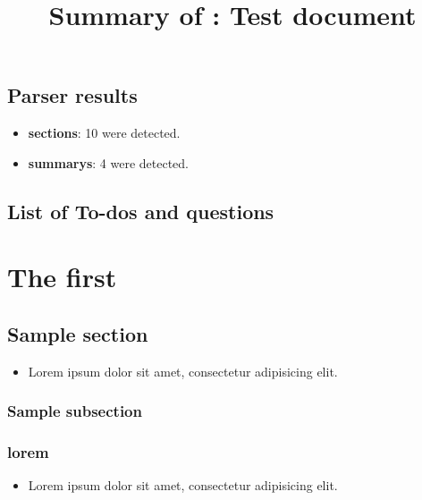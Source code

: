 \title{Summary of : Test document}
\maketitle

\section{Parser results}
    \begin{itemize}[noitemsep]
\item \textbf{sections}: 10 were detected.
\item \textbf{summarys}: 4 were detected.
    \end{itemize}

\section{List of To-dos and questions}
\vspace{-36pt}\hspace{11pt}

\chapter{The first}
\label{autosec:0}
\vspace{-36pt}\hspace{11pt}
\section{Sample section}
\label{autosec:1}
    \begin{itemize}[noitemsep]
        \item Lorem ipsum dolor sit amet, consectetur adipisicing elit.
    \end{itemize}
\subsection{Sample subsection}
\label{autosec:2}
\vspace{-36pt}\hspace{11pt}
\subsection{lorem}
\label{autosec:3}
    \begin{itemize}[noitemsep]
        \item Lorem ipsum dolor sit amet, consectetur adipisicing elit.
    \end{itemize}
